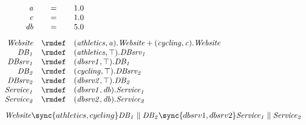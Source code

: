 \begin{displaymath}
	\begin{array}{rcl}
		\mathit{a} & = & 1.0\\
		\mathit{c} & = & 1.0\\
		\mathit{db} & = & 5.0\\
[2.0ex]		\mathit{Website} & \rmdef & (\mathit{athletics},\mathit{a}).\mathit{Website}+(\mathit{cycling},\mathit{c}).\mathit{Website}\\
		\mathit{DB_1} & \rmdef & (\mathit{athletics},\top).\mathit{DBsrv_1}\\
		\mathit{DBsrv_1} & \rmdef & (\mathit{dbsrv1},\top).\mathit{DB_1}\\
		\mathit{DB_2} & \rmdef & (\mathit{cycling},\top).\mathit{DBsrv_2}\\
		\mathit{DBsrv_2} & \rmdef & (\mathit{dbsrv2},\top).\mathit{DB_2}\\
		\mathit{Service_1} & \rmdef & (\mathit{dbsrv1},\mathit{db}).\mathit{Service_1}\\
		\mathit{Service_2} & \rmdef & (\mathit{dbsrv2},\mathit{db}).\mathit{Service_2}\\
[2.0ex]		\multicolumn{3}{l}{\mathit{Website}\sync{athletics,cycling}\mathit{DB_1}\parallel\mathit{DB_2}\sync{dbsrv1,dbsrv2}\mathit{Service_1}\parallel\mathit{Service_2}}\\
[2.0ex]	\end{array}
\end{displaymath}

